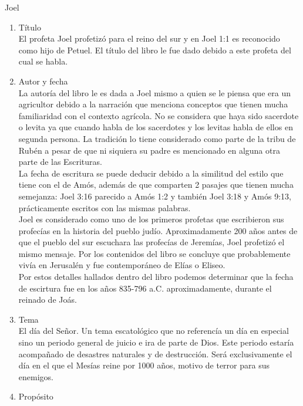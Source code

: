 %
%
\begin{section}{Joel}
	\begin{enumerate}
		\item Título\\
			El profeta Joel profetizó para el reino del sur y en Joel 1:1 es reconocido como hijo de Petuel. El título del libro le fue dado debido a este profeta del cual se habla.
		\item Autor y fecha\\
			La autoría del libro le es dada a Joel mismo a quien se le piensa que era un agricultor debido a la narración que menciona conceptos que tienen mucha familiaridad con el contexto agrícola. No se considera que haya sido sacerdote o levita ya que cuando habla de los sacerdotes y los levitas habla de ellos en segunda persona. La tradición lo tiene considerado como parte de la tribu de Rubén a pesar de que ni siquiera su padre es mencionado en alguna otra parte de las Escrituras.\\
			La fecha de escritura se puede deducir debido a la similitud del estilo que tiene con el de Amós, además de que comparten 2 pasajes que tienen mucha semejanza: Joel 3:16 parecido a Amós 1:2 y también Joel 3:18 y Amós 9:13, prácticamente escritos con las mismas palabras.\\
			Joel es considerado como uno de los primeros profetas que escribieron sus profecías en la historia del pueblo judío. Aproximadamente 200 años antes de que el pueblo del sur escuchara las profecías de Jeremías, Joel profetizó el mismo mensaje. Por los contenidos del libro se concluye que probablemente vivía en Jerusalén y fue contemporáneo de Elías o Eliseo.\\
			Por estos detalles hallados dentro del libro podemos determinar que la fecha de escirtura fue en los años 835-796 a.C. aproximadamente, durante el reinado de Joás.
		\item Tema\\
			El día del Señor. Un tema escatológico que no referencía un día en especial sino un periodo general de juicio e ira de parte de Dios. Este periodo estaría acompañado de desastres naturales y de destrucción. Será exclusivamente el día en el que el Mesías reine por 1000 años, motivo de terror para sus enemigos.
		\item Propósito\\

\end{enumerate}
\end{section}
